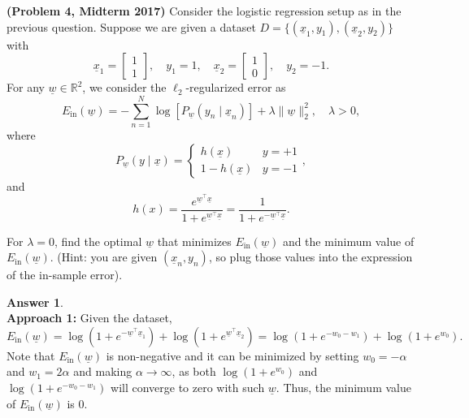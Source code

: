\documentclass{article}
\theoremstyle{definition}
\newtheorem*{answer}{Answer}
\begin{document}
\begin{question}
	\item \textbf{(Problem 4, Midterm 2017)} Consider the logistic regression setup as in the previous question. Suppose we are given a dataset $D = \{(\underline{x}_1, y_1), (\underline{x}_2, y_2)\}$ with
	\[
	\underline{x}_1 = \begin{bmatrix} 1 \\ 1 \end{bmatrix}, \quad y_1 = 1, \quad \underline{x}_2 = \begin{bmatrix} 1 \\ 0 \end{bmatrix}, \quad y_2 = -1.
	\]
	For any $\underline{w} \in \mathbb{R}^2$, we consider the $\ell_2$-regularized error as
	\[
	E_{\text{in}}(\underline{w}) = -\sum_{n=1}^N \log \left[ P_{\underline{w}}(y_n \mid \underline{x}_n) \right] + \lambda \|\underline{w}\|_2^2, \quad \lambda > 0,
	\]
	where
	\[
	P_{\underline{w}}(y \mid \underline{x}) = \begin{cases}
		h(\underline{x}) & y = +1 \\
		1 - h(\underline{x}) & y = -1
	\end{cases},
	\]
	and
	\[
	h(x) = \frac{e^{\underline{w}^\top \underline{x}}}{1 + e^{\underline{w}^\top \underline{x}}} = \frac{1}{1 + e^{-\underline{w}^\top \underline{x}}}.
	\]
	\begin{question}
		\item For $\lambda = 0$, find the optimal $\underline{w}$ that minimizes $E_{\text{in}}(\underline{w})$ and the minimum value of $E_{\text{in}}(\underline{w})$. (Hint: you are given $(\underline{x}_n, y_n)$, so plug those values into the expression of the in-sample error).
		\begin{answer}
			~\\
			\textbf{Approach 1:} Given the dataset, $$E_{\text{in}}(\underline{w}) = \log(1+e^{-\underline{w}^\top \underline{x}_1}) + \log(1+e^{\underline{w}^\top \underline{x}_2}) = \log(1+e^{-w_0-w_1}) + \log(1+e^{w_0}).$$ Note that $E_{\text{in}}(\underline{w})$ is non-negative and it can be minimized by setting $w_0=-\alpha$ and $w_1= 2\alpha$ and making $\alpha \rightarrow \infty$, as both $\log(1+e^{w_0})$ and $\log(1+e^{-w_0-w_1})$ will converge to zero with such $\underline{w}$. Thus, the minimum value of $ E_{\text{in}}(\underline{w})$ is $0$.\\
			

\end{answer}
\end{question}
\end{question}
\end{document}
